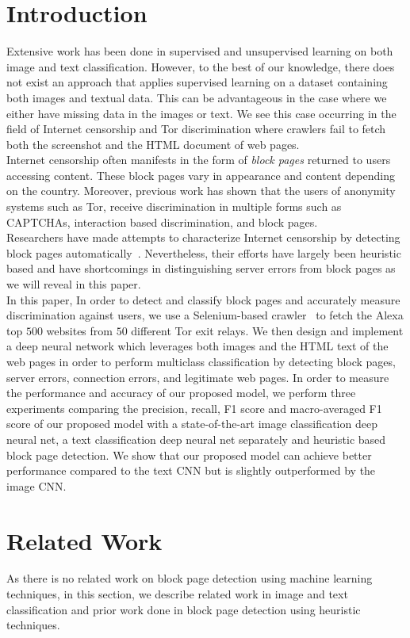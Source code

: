 \documentclass{article} %
\begin{document}
\section{Introduction}
Extensive work has been done in supervised and unsupervised learning on both image and text classification. However, to the best of our knowledge, there does not exist an approach that applies supervised learning on a dataset containing both images and textual data. This can be advantageous in the case where we either have missing data in the images or text. We see this case occurring in the field of Internet censorship and Tor discrimination where crawlers fail to fetch both the screenshot and the HTML document of web pages.\\
Internet censorship often manifests in the form of \emph{block pages} returned to users accessing content. These block pages vary in appearance and content depending on the country. 
Moreover, previous work has shown that the users of anonymity systems such as Tor, receive discrimination in multiple forms such as CAPTCHAs, interaction based discrimination, and block pages.~\cite{torabuse}\\
Researchers have made attempts to characterize Internet censorship by detecting block pages automatically~\cite{imc14_phillipa}. Nevertheless, their efforts have largely been heuristic based and have shortcomings in distinguishing server errors from block pages as we will reveal in this paper.\\
In this paper, In order to detect and classify block pages and accurately measure discrimination against users, we use a Selenium-based crawler~\cite{selenium} to fetch the Alexa top $500$ websites from $50$ different Tor exit relays. We then design and implement a deep neural network which leverages both images and the HTML text of the web pages in order to perform multiclass classification by detecting block pages, server errors, connection errors, and legitimate web pages. In order to measure the performance and accuracy of our proposed model, we perform three experiments comparing the precision, recall, F1 score and macro-averaged F1 score of our proposed model with a state-of-the-art image classification deep neural net, a text classification deep neural net separately and heuristic based block page detection. We show that our proposed model can achieve better performance compared to the text CNN but is slightly outperformed by the image CNN. 
\section{Related Work}
As there is no related work on block page detection using machine learning techniques, in this section, we describe related work in image and text classification and prior work done in block page detection using heuristic techniques.
\end{document}
